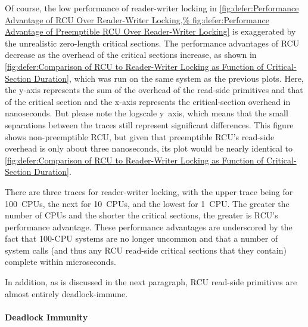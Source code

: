 Of course, the low performance of reader-writer locking in
\cref{fig:defer:Performance Advantage of RCU Over Reader-Writer Locking,%
fig:defer:Performance Advantage of Preemptible RCU Over Reader-Writer Locking}
is exaggerated by the unrealistic zero-length critical sections.
The performance advantages of RCU decrease as the overhead of the critical
sections increase, as shown in
\cref{fig:defer:Comparison of RCU to Reader-Writer Locking as Function of Critical-Section Duration},
which was run on the same system as the previous plots.
Here, the y-axis represents the sum of the overhead of the read-side
primitives and that of the critical section and the x-axis represents
the critical-section overhead in nanoseconds.
But please note the logscale y~axis, which means that the small
separations between the traces still represent significant differences.
This figure shows non-preemptible RCU, but given that preemptible RCU's
read-side overhead is only about three nanoseconds, its plot would be
nearly identical to
\cref{fig:defer:Comparison of RCU to Reader-Writer Locking as Function of Critical-Section Duration}.

\QuickQuizEnd

There are three traces for reader-writer locking, with the upper trace
being for 100~CPUs, the next for 10~CPUs, and the lowest for 1~CPU\@.
The greater the number of CPUs and the shorter the critical sections,
the greater is RCU's performance advantage.
These performance advantages are underscored by the fact that 100-CPU
systems are no longer uncommon and that a number of system calls (and
thus any RCU read-side critical sections that they contain) complete
within microseconds.

In addition, as is discussed in the next paragraph,
RCU read-side primitives are almost entirely deadlock-immune.


\paragraph{Deadlock Immunity}

